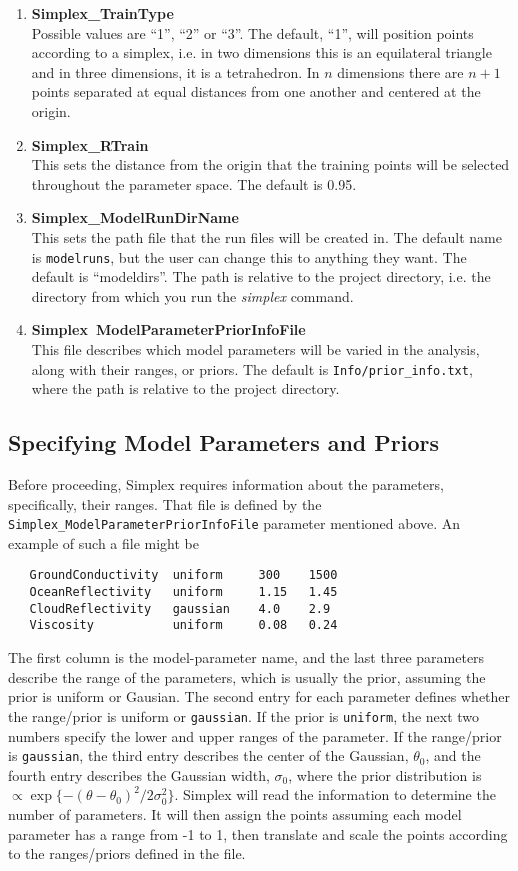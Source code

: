 \documentclass[main.tex]{subfiles}
\begin{document}
\begin{enumerate}\itemsep 0pt
    \item {\bf Simplex\_TrainType}\\
Possible values are ``1'', ``2'' or ``3''. The default, ``1'', will position points according to a simplex, i.e. in two dimensions this is an equilateral triangle and in three dimensions, it is a tetrahedron. In $n$ dimensions there are $n+1$ points separated at equal distances from one another and centered at the origin. 
\item {\bf Simplex\_RTrain}\\
This sets the distance from the origin that the training points will be selected throughout the parameter space. The default is 0.95.
\item {\bf Simplex\_ModelRunDirName}\\
This sets the path file that the run files will be created in. The default name is {\tt{modelruns}}, but the user can change this to anything they want. The default is ``modeldirs''. The path is relative to the project directory, i.e. the directory from which you run the {\it simplex} command.
\item {\bf Simplex\ ModelParameterPriorInfoFile}\\
This file describes which model parameters will be varied in the analysis, along with their ranges, or priors. The default is {\tt Info/prior\_info.txt}, where the path is relative to the project directory.
\end{enumerate}

\subsection{Specifying Model Parameters and Priors}

Before proceeding, Simplex requires information about the parameters, specifically, their ranges. That file is defined by the {\tt Simplex\_ModelParameterPriorInfoFile} parameter mentioned above. An example of such a file might be
{\tt\begin{verbatim}
   GroundConductivity  uniform     300    1500
   OceanReflectivity   uniform     1.15   1.45
   CloudReflectivity   gaussian    4.0    2.9
   Viscosity           uniform     0.08   0.24
\end{verbatim}
}
The first column is the model-parameter name, and the last three parameters describe the range of the parameters, which is usually the prior, assuming the prior is uniform or Gausian. The second entry for each parameter defines whether the range/prior is uniform or {\tt gaussian}. If the prior is {\tt uniform}, the next two numbers specify the lower and upper ranges of the parameter. If the range/prior is {\tt gaussian}, the third entry describes the center of the Gaussian, $\theta_0$, and the fourth entry describes the Gaussian width, $\sigma_0$, where the prior distribution is $\propto \exp\{-(\theta-\theta_0)^2/2\sigma_0^2\}$. Simplex will read the information to determine the number of parameters. It will then assign the points assuming each model parameter has a range from -1 to 1, then translate and scale the points according to the ranges/priors defined in the file.
\end{document}

